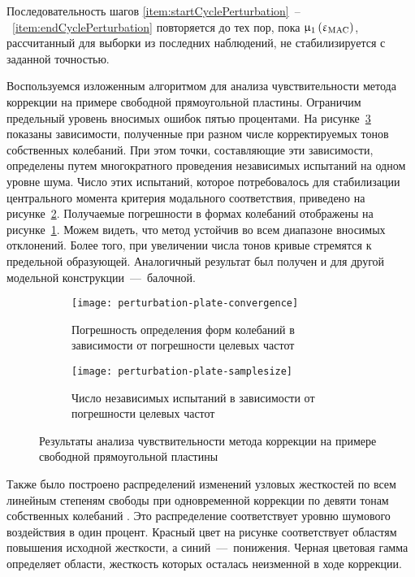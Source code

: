 Последовательность шагов \ref{item:startCyclePerturbation}~--~\ref{item:endCyclePerturbation} повторяется до тех пор, пока $ \upmu_1\left( \upvarepsilon_{\mathrm{MAC}} \right) $, рассчитанный для выборки из последних наблюдений, не стабилизируется с заданной точностью. 

Воспользуемся изложенным алгоритмом для анализа чувствительности метода коррекции на примере свободной прямоугольной пластины. Ограничим предельный уровень вносимых ошибок пятью процентами. На рисунке~\ref{fig:perturbation-plate} показаны зависимости, полученные при разном числе корректируемых тонов собственных колебаний. При этом точки, составляющие эти зависимости, определены путем многократного проведения независимых испытаний на одном уровне шума. Число этих испытаний, которое потребовалось для стабилизации центрального момента критерия модального соответствия, приведено на рисунке~\ref{fig:perturbation-plate-samplesize}. Получаемые погрешности в формах колебаний отображены на рисунке~\ref{fig:perturbation-plate-convergence}. Можем видеть, что метод устойчив во всем диапазоне вносимых отклонений. Более того, при увеличении числа тонов кривые стремятся к предельной образующей. Аналогичный результат был получен и для другой модельной конструкции~---~балочной.

\begin{figure}[!htb]
	\begin{subfigure}[b]{0.46\textwidth}
		\texttt{[image: perturbation-plate-convergence]}
		\caption{Погрешность определения форм колебаний в зависимости от погрешности целевых частот} \label{fig:perturbation-plate-convergence}
	\end{subfigure}
	\hfill
	\begin{subfigure}[b]{0.48\textwidth}
		\texttt{[image: perturbation-plate-samplesize]}
		\caption{Число независимых испытаний в зависимости от погрешности целевых частот} \label{fig:perturbation-plate-samplesize}
	\end{subfigure}
	\caption{Результаты анализа чувствительности метода коррекции на примере свободной прямоугольной пластины} \label{fig:perturbation-plate}
\end{figure}

Также было построено распределений изменений узловых жесткостей по всем линейным степеням свободы при одновременной коррекции по девяти тонам собственных колебаний . Это распределение соответствует уровню шумового воздействия в один процент. Красный цвет на рисунке соответствует областям повышения исходной жесткости, а синий~---~понижения. Черная цветовая гамма определяет области, жесткость которых осталась неизменной в ходе коррекции.

